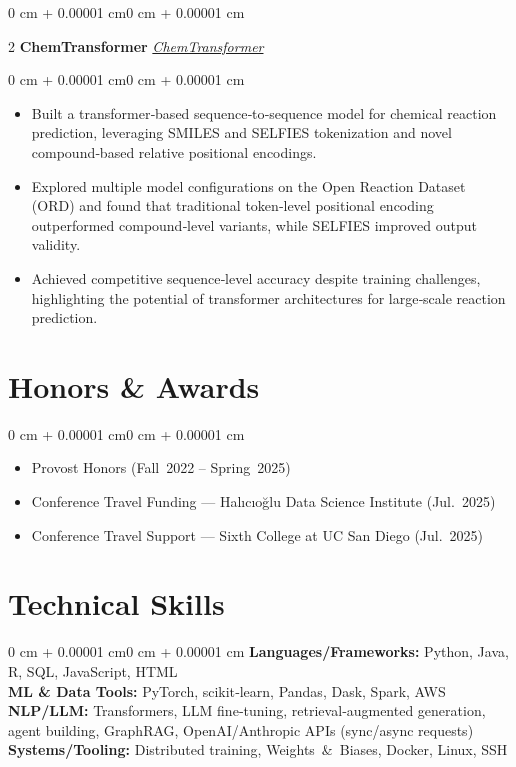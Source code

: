 \documentclass[10pt, letterpaper]{article}
\newenvironment{highlights}{\begin{itemize}[topsep=0.10 cm, parsep=0.10 cm, partopsep=0pt, itemsep=0pt, leftmargin=0 cm + 10pt]}{\end{itemize}}
\newenvironment{onecolentry}{\begin{adjustwidth}{0 cm + 0.00001 cm}{0 cm + 0.00001 cm}}{\end{adjustwidth}}
\newenvironment{twocolentry}[2][]{\onecolentry \def\secondColumn{#2} \setcolumnwidth{\fill, 4.5 cm} \begin{paracol}{2}}{\switchcolumn \raggedleft \secondColumn \end{paracol} \endonecolentry}
\let\hrefWithoutArrow\href
\renewcommand{\href}[2]{\hrefWithoutArrow{#1}{#2}}
\begin{document}
    \vspace{0.2 cm}

    \begin{twocolentry}{\textit{\href{https://aaronzhfeng.github.io/projects/chemtransformer}{ChemTransformer}}}
        \textbf{ChemTransformer}
    \end{twocolentry}

    \vspace{0.10 cm}
    \begin{onecolentry}
        \begin{highlights}
            \item Built a transformer‑based sequence‑to‑sequence model for chemical reaction prediction, leveraging SMILES and SELFIES tokenization and novel compound‑based relative positional encodings.
            \item Explored multiple model configurations on the Open Reaction Dataset (ORD) and found that traditional token‑level positional encoding outperformed compound‑level variants, while SELFIES improved output validity.
            \item Achieved competitive sequence‑level accuracy despite training challenges, highlighting the potential of transformer architectures for large‑scale reaction prediction.
        \end{highlights}
    \end{onecolentry}

    \section{Honors \& Awards}

    \begin{onecolentry}
        \begin{highlights}
            \item Provost Honors (Fall 2022 – Spring 2025)
            \item Conference Travel Funding — Halıcıo\u{g}lu Data Science Institute (Jul. 2025)
            \item Conference Travel Support — Sixth College at UC San Diego (Jul. 2025)
        \end{highlights}
    \end{onecolentry}

    \section{Technical Skills}

    \begin{onecolentry}
        \textbf{Languages/Frameworks:} Python, Java, R, SQL, JavaScript, HTML \\
        \textbf{ML \& Data Tools:} PyTorch, scikit‑learn, Pandas, Dask, Spark, AWS \\
        \textbf{NLP/LLM:} Transformers, LLM fine‑tuning, retrieval‑augmented generation, agent building, GraphRAG, OpenAI/Anthropic APIs (sync/async requests) \\
        \textbf{Systems/Tooling:} Distributed training, Weights \& Biases, Docker, Linux, SSH
    \end{onecolentry}
\end{document}
